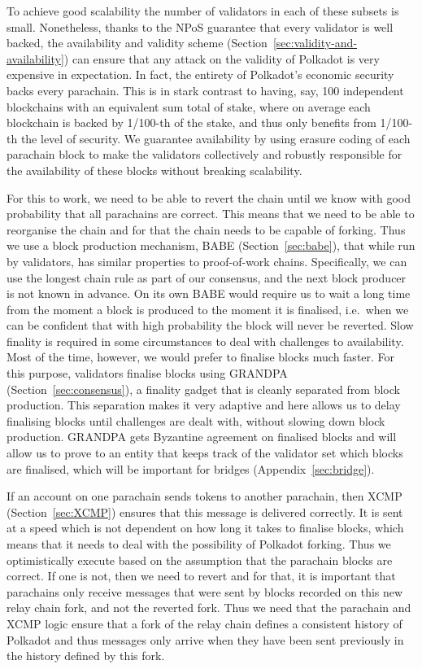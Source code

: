 \documentclass{article}
\begin{document}
To achieve good scalability the number of validators in each of these subsets is small. Nonetheless, thanks to the NPoS guarantee that every validator is well backed, the availability and validity scheme (Section~\ref{sec:validity-and-availability}) can ensure that any attack on the validity of Polkadot is very expensive in expectation. In fact, the entirety of Polkadot's economic security backs every parachain. This is in stark contrast to having, say, 100 independent blockchains with an equivalent sum total of stake, where on average each blockchain is backed by 1/100-th of the stake, and thus only benefits from 1/100-th the level of security. We guarantee availability by using erasure coding of each parachain block to make the validators collectively and robustly responsible for the availability of these blocks without breaking scalability.

For this to work, we need to be able to revert the chain until we know with good probability that all parachains are correct. This means that we need to be able to reorganise the chain and for that the chain needs to be capable of forking. Thus we use a block production mechanism, BABE (Section~\ref{sec:babe}), that while run by validators, has similar properties to proof-of-work chains. Specifically, we can use the longest chain rule as part of our consensus, and the next block producer is not known in advance. On its own BABE would require us to wait a long time from the moment a block is produced to the moment it is finalised, i.e.~when we can be confident that with high probability the block will never be reverted. Slow finality is required in some circumstances to deal with challenges to availability. Most of the time, however, we would prefer to finalise blocks much faster.  For this purpose, validators finalise blocks using GRANDPA (Section~\ref{sec:consensus}), a finality gadget that is cleanly separated from block production. This separation makes it very adaptive and here allows us to delay finalising blocks until challenges are dealt with, without slowing down block production. GRANDPA gets Byzantine agreement on finalised blocks and will allow us to prove to an entity that keeps track of the validator set which blocks are finalised, which will be important for bridges (Appendix~\ref{sec:bridge}).

If an account on one parachain sends tokens to another parachain, then XCMP (Section~\ref{sec:XCMP}) ensures that this message is delivered correctly. It is sent at a speed which is not dependent on how long it takes to finalise blocks, which means that it needs to deal with the possibility of Polkadot forking. Thus we optimistically execute based on the assumption that the parachain blocks are correct. If one is not, then we need to revert and for that, it is important that parachains only receive messages that were sent by blocks recorded on this new relay chain fork, and not the reverted fork. Thus we need that  the parachain and XCMP logic ensure that a fork of the relay chain defines a consistent history of Polkadot and thus messages only arrive when they have been sent previously in the history defined by this fork. 
\end{document}
